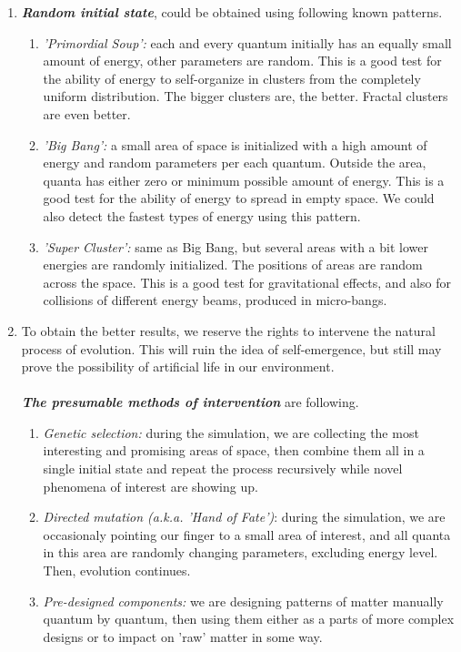 \documentclass[a4paper,12pt,tikz,UTF8]{article}
\begin{document}
\begin{enumerate}
    \item \textbf{\textit{Random initial state}}, could be obtained using following known patterns.
      \begin{enumerate}
        \item \textit{'Primordial Soup':} each and every quantum initially has an equally small amount of energy, other parameters are random. This is a good test for the ability of energy to self-organize in clusters from the completely uniform distribution. The bigger clusters are, the better. Fractal clusters are even better.
        \item \textit{'Big Bang':} a small area of space is initialized with a high amount of energy and random parameters per each quantum. Outside the area, quanta has either zero or minimum possible amount of energy. This is a good test for the ability of energy to spread in empty space. We could also detect the fastest types of energy using this pattern. 
        \item \textit{'Super Cluster':} same as Big Bang, but several areas with a bit lower energies are randomly initialized. The positions of areas are random across the space. This is a good test for gravitational effects, and also for collisions of different energy beams, produced in micro-bangs.
      \end{enumerate}

    \item To obtain the better results, we reserve the rights to intervene the natural process of evolution. This will ruin the idea of self-emergence, but still may prove the possibility of artificial life in our environment.\\\\
          \textbf{\textit{The presumable methods of intervention}} are following.
      \begin{enumerate}
        \item \textit{Genetic selection:} during the simulation, we are collecting the most interesting and promising areas of space, then combine them all in a single initial state and repeat the process recursively while novel phenomena of interest are showing up.
        \item \textit{Directed mutation (a.k.a. 'Hand of Fate')}: during the simulation, we are occasionaly pointing our finger to a small area of interest, and all quanta in this area are randomly changing parameters, excluding energy level. Then, evolution continues. 
        \item \textit{Pre-designed components:} we are designing patterns of matter manually quantum by quantum, then using them either as a parts of more complex designs or to impact on 'raw' matter in some way.
      \end{enumerate}

  \end{enumerate}
\end{document}
